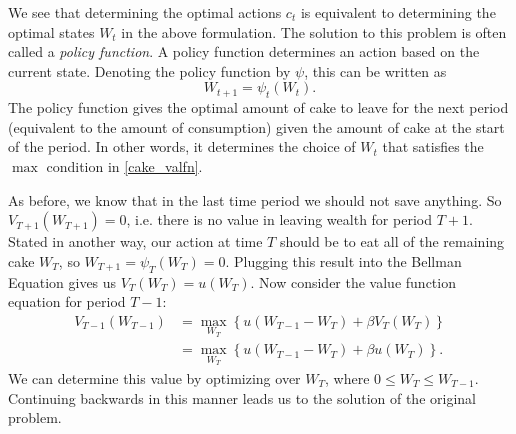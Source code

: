 We see that determining the optimal actions $c_t$ is equivalent to determining the optimal states $W_{t}$ in the
above formulation. The solution to this
problem is often called a \emph{policy function}.  A policy function determines an action based on the current
state.  Denoting the policy function by $\psi$, this can be written as
\begin{equation*}
W_{t+1}=\psi_t \left(W_t\right).
\end{equation*}
The policy function gives the optimal amount of cake to leave for the next period (equivalent to the amount of consumption) given
the amount of cake at the start of the period.  In other words, it determines the choice of $W_t$ that satisfies the $\max$
condition in \eqref{cake_valfn}.

As before, we know that in the last time period we should not save anything.  So $V_{T+1}(W_{T+1}) = 0$, i.e. there is
no value in leaving wealth for period $T+1$. Stated in another way, our action at time $T$ should be to eat all of the
remaining cake $W_T$, so $W_{T+1} = \psi_T(W_T) = 0$.
Plugging this result into the Bellman Equation gives us $V_T(W_T) = u(W_T)$.
Now consider the value function equation for period $T-1$:
\begin{align*}
V_{T-1}(W_{T-1}) &= \max_{W_T} \left\{u(W_{T-1} - W_T) + \beta V_T(W_T)\right\} \\
                 &= \max_{W_T} \left\{u(W_{T-1} - W_T) + \beta u(W_T)\right\}.
\end{align*}
We can determine this value by optimizing over $W_T$, where $0 \leq W_T \leq W_{T-1}$.
Continuing backwards in this manner leads us to the solution of the original problem.


